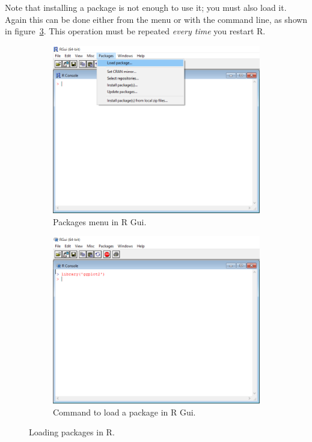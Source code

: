 \documentclass{report}
\begin{document}
	Note that installing a package is not enough to use it; you must also load it. Again this can be done either from the menu or with the command line, as shown in figure~\ref{fig:load}. This operation must be repeated \emph{every time} you restart R.
	\begin{figure}[h]
		\centering
		\begin{subfigure}[t]{0.475\textwidth}
			\centering
			\includegraphics[width=\textwidth]{load.png}
			\caption{Packages menu in R Gui.}
			\label{fig:loadmenu}
		\end{subfigure}
		\hfill
		\begin{subfigure}[t]{0.475\textwidth}
			\centering
			\includegraphics[width=\textwidth]{cli.png}
			\caption{Command to load a package in R Gui.}
			\label{fig:cli}
		\end{subfigure}
		\caption{Loading packages in R.}
		\label{fig:load}
	\end{figure}
\end{document}
